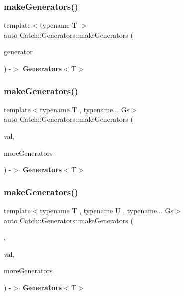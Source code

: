 \mbox{\label{namespace_catch_1_1_generators_abefb1a0fab3c669b98a53037b3286d22}} 
\subsubsection{makeGenerators()\hspace{0.1cm}{\footnotesize\ttfamily [2/4]}}
{\footnotesize\ttfamily template$<$typename T $>$ \\
auto Catch\+::\+Generators\+::make\+Generators (\begin{DoxyParamCaption}\item[{\textbf{ Generator\+Wrapper}$<$ T $>$ \&\&}]{generator }\end{DoxyParamCaption}) -\/$>$ \textbf{ Generators}$<$T$>$ }

\mbox{\label{namespace_catch_1_1_generators_a0497b4463b7afee28df49631d6d75e83}} 
\subsubsection{makeGenerators()\hspace{0.1cm}{\footnotesize\ttfamily [3/4]}}
{\footnotesize\ttfamily template$<$typename T , typename... Gs$>$ \\
auto Catch\+::\+Generators\+::make\+Generators (\begin{DoxyParamCaption}\item[{T \&\&}]{val,  }\item[{Gs...}]{more\+Generators }\end{DoxyParamCaption}) -\/$>$ \textbf{ Generators}$<$T$>$ }

\mbox{\label{namespace_catch_1_1_generators_a4032a75da538c6897f826399368e16ed}} 
\subsubsection{makeGenerators()\hspace{0.1cm}{\footnotesize\ttfamily [4/4]}}
{\footnotesize\ttfamily template$<$typename T , typename U , typename... Gs$>$ \\
auto Catch\+::\+Generators\+::make\+Generators (\begin{DoxyParamCaption}\item[{\textbf{ as}$<$ T $>$}]{,  }\item[{U \&\&}]{val,  }\item[{Gs...}]{more\+Generators }\end{DoxyParamCaption}) -\/$>$ \textbf{ Generators}$<$T$>$ }

